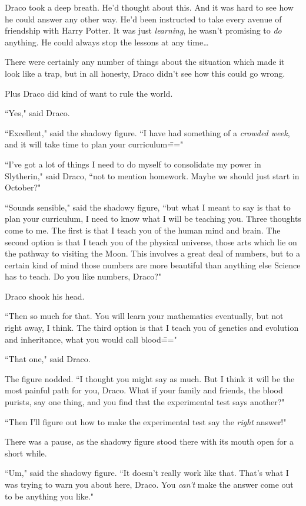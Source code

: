 Draco took a deep breath. He'd thought about this. And it was hard to see how he could answer any other way. He'd been instructed to take every avenue of friendship with Harry Potter. It was just \emph{learning}, he wasn't promising to \emph{do} anything. He could always stop the lessons at any time{\ldots}

There were certainly any number of things about the situation which made it look like a trap, but in all honesty, Draco didn't see how this could go wrong.

Plus Draco did kind of want to rule the world.

``Yes," said Draco.

``Excellent," said the shadowy figure. ``I have had something of a \emph{crowded week}, and it will take time to plan your curriculum\==="

``I've got a lot of things I need to do myself to consolidate my power in Slytherin," said Draco, ``not to mention homework. Maybe we should just start in October?"

``Sounds sensible," said the shadowy figure, ``but what I meant to say is that to plan your curriculum, I need to know what I will be teaching you. Three thoughts come to me. The first is that I teach you of the human mind and brain. The second option is that I teach you of the physical universe, those arts which lie on the pathway to visiting the Moon. This involves a great deal of numbers, but to a certain kind of mind those numbers are more beautiful than anything else Science has to teach. Do you like numbers, Draco?"

Draco shook his head.

``Then so much for that. You will learn your mathematics eventually, but not right away, I think. The third option is that I teach you of genetics and evolution and inheritance, what you would call blood\==="

``That one," said Draco.

The figure nodded. ``I thought you might say as much. But I think it will be the most painful path for you, Draco. What if your family and friends, the blood purists, say one thing, and you find that the experimental test says another?"

``Then I'll figure out how to make the experimental test say the \emph{right} answer!"

There was a pause, as the shadowy figure stood there with its mouth open for a short while.

``Um," said the shadowy figure. ``It doesn't really work like that. That's what I was trying to warn you about here, Draco. You \emph{can't} make the answer come out to be anything you like."

